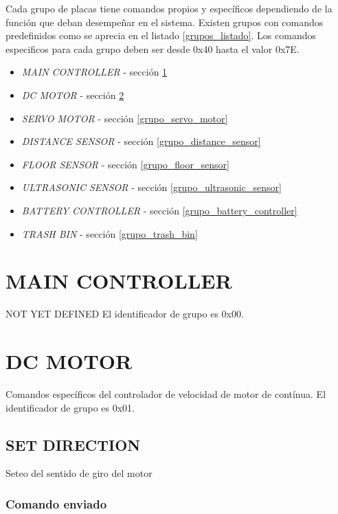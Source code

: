 \documentclass[a4paper,10pt]{article}
\begin{document}
Cada grupo de placas tiene comandos propios y espec\'ificos dependiendo de la funci\'on que deban desempe\~nar en el sistema.
Existen grupos con comandos predefinidos como se aprecia en el listado \ref{grupos_listado}.
Los comandos especificos para cada grupo deben ser desde 0x40 hasta el valor 0x7E.

\begin{itemize}
	\item \emph{MAIN CONTROLLER} - secci\'on \ref{grupo_main_controller}
	\item \emph{DC MOTOR} - secci\'on \ref{grupo_dc_motor}
	\item \emph{SERVO MOTOR} - secci\'on \ref{grupo_servo_motor}
	\item \emph{DISTANCE SENSOR} - secci\'on \ref{grupo_distance_sensor}
	\item \emph{FLOOR SENSOR} - secci\'on \ref{grupo_floor_sensor}
	\item \emph{ULTRASONIC SENSOR} - secci\'on \ref{grupo_ultrasonic_sensor}
	\item \emph{BATTERY CONTROLLER} - secci\'on \ref{grupo_battery_controller}
	\item \emph{TRASH BIN} - secci\'on \ref{grupo_trash_bin}
\label{grupos_listado}
\end{itemize}

\section{MAIN CONTROLLER}
\label{grupo_main_controller}

NOT YET DEFINED
El identificador de grupo es 0x00.

\section{DC MOTOR}
\label{grupo_dc_motor}

Comandos espec\'ificos del controlador de velocidad de motor de cont\'inua.
El identificador de grupo es 0x01.

\subsection{SET DIRECTION}
\label{set_direction}

Seteo del sentido de giro del motor

\subsubsection*{Comando enviado}
\end{document}
